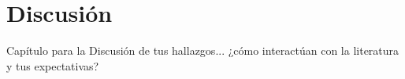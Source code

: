 
\chapter{Discusión} %

\label{Cap_Disc} %

Capítulo para la Discusión de tus hallazgos... ¿cómo interactúan con la literatura y tus expectativas?






